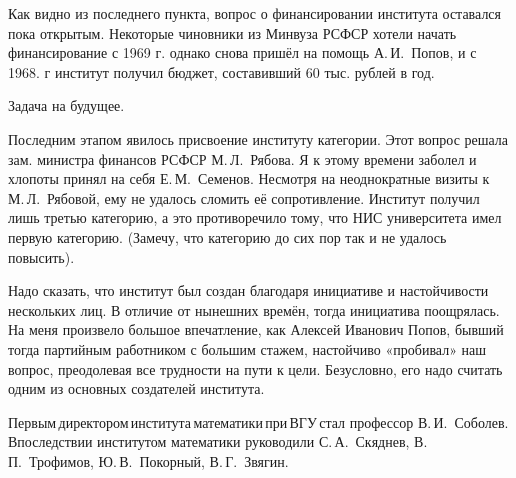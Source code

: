Как видно из последнего пункта, вопрос о финансировании института оставался пока открытым. Некоторые чиновники из Минвуза РСФСР хотели начать финансирование с 1969 г. однако снова пришёл на помощь А.\,И.~Попов, и с 1968. г институт получил бюджет, составивший 60 тыс. рублей в год.

Задача  на  будущее.

Последним этапом явилось присвоение институту категории. Этот вопрос решала зам. министра финансов РСФСР М.\,Л.~Рябова. Я к этому времени заболел и хлопоты принял на себя Е.\,М.~Семенов. Несмотря на неоднократные визиты к М.\,Л.~Рябовой, ему не удалось сломить её сопротивление. Институт получил лишь третью категорию, а это противоречило тому, что НИС университета имел первую категорию. (Замечу, что категорию до сих пор так и не удалось повысить).

Надо сказать, что институт был создан благодаря инициативе и настойчивости нескольких лиц. В отличие от нынешних времён, тогда инициатива поощрялась. На меня \linebreak произвело большое впечатление, как Алексей Иванович Попов, бывший тогда партийным работником с большим стажем, настойчиво «пробивал» наш вопрос, преодолевая все трудности на пути к цели. Безусловно, его надо считать одним из основных создателей института.

Первым\,директором\,института\,математики\,при\,ВГУ\,стал \linebreak профессор В.\,И.~Соболев. Впоследствии институтом математики руководили С.\,А.~Скяднев, В.\,П.~Трофимов, Ю.\,В.~Покорный, В.\,Г.~Звягин.
